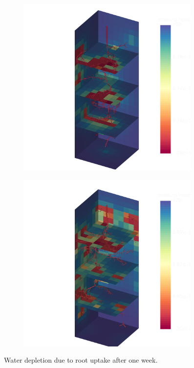 \begin{figure}
\begin{subfigure}[c]{0.5\textwidth}
\includegraphics[width=0.99\textwidth]{example6c.png}
 \label{fig:example6c}
\end{subfigure}
\begin{subfigure}[c]{0.5\textwidth}
\includegraphics[width=0.99\textwidth]{example6c_periodic.png}
 \label{fig:example6c_peridodic}
\end{subfigure}
\caption{Water depletion due to root uptake after one week. } \label{fig:example6c}
\end{figure}

